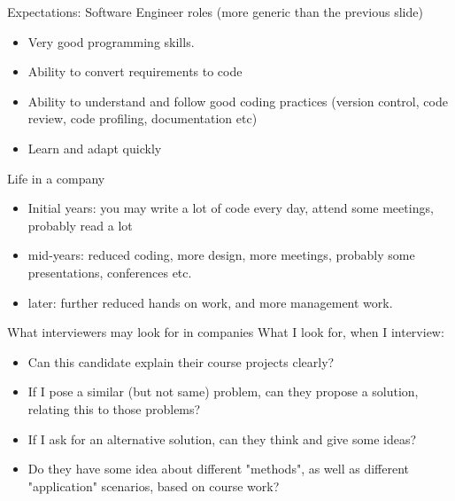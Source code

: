 \documentclass{beamer}
\begin{document}
\begin{frame}{Expectations: Software Engineer roles}
(more generic than the previous slide)
    \begin{itemize}
        \item Very good programming skills.
        \item Ability to convert requirements to code
        \item Ability to understand and follow good coding practices (version control, code review, code profiling, documentation etc)
        \item Learn and adapt quickly
    \end{itemize}
\end{frame}

\begin{frame}{Life in a company}
    \begin{itemize}
        \item Initial years: you may write a lot of code every day, attend some meetings, probably read a lot
        \item mid-years: reduced coding, more design, more meetings, probably some presentations, conferences etc.
        \item later: further reduced hands on work, and more management work. 
    \end{itemize}
\end{frame}

\begin{frame}{What interviewers may look for in companies}
What I look for, when I interview: 
   \begin{itemize}
       \item Can this candidate explain their course projects clearly?
       \item If I pose a similar (but not same) problem, can they propose a solution, relating this to those problems?
       \item If I ask for an alternative solution, can they think and give some ideas?
       \item Do they have some idea about different "methods", as well as different "application" scenarios, based on course work? 
   \end{itemize}
\end{frame}
\end{document}
